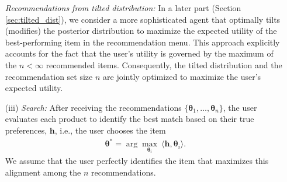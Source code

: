 \documentclass[12pt]{article}
\theoremstyle{definition}
\theoremstyle{remark}
\begin{document}
\begin{itemize}
    \textit{Recommendations from tilted distribution:} In a later part (Section \ref{sec:tilted_dist}), we consider a more sophisticated agent that optimally tilts (modifies) the posterior distribution to maximize the expected utility of the best-performing item in the recommendation menu. This approach explicitly accounts for the fact that the user’s utility is governed by the maximum of the $n< \infty$ recommended items. Consequently, the tilted distribution and the recommendation set size $n$ are jointly optimized to maximize the user’s expected utility.

    \item[(iii)] \textit{Search:} After receiving the recommendations $\{\boldsymbol\theta_1, \dots, \boldsymbol \theta_n\}$, the user evaluates each product to identify the best match based on their true preferences, $\mathbf{h}$, i.e., the user chooses the item
    \begin{align*}
        \boldsymbol \theta^* = \arg\max_{\boldsymbol \theta_i} \ \langle \mathbf h , \boldsymbol \theta_i \rangle.
    \end{align*}
    We assume that the user perfectly identifies the item that maximizes this alignment among the $n$ recommendations.
\end{itemize}
\end{document}
